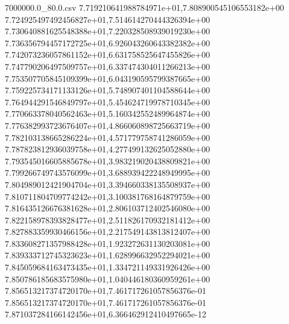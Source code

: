 \begin{filecontents*}{7000000.0_80.0.csv}
7.719210641988784971e+01,7.808900545106553182e+00
7.724925497492456827e+01,7.514614270444326394e+00
7.730640881625548388e+01,7.220328508939019230e+00
7.736356794457172725e+01,6.926043260643382382e+00
7.742073236057861152e+01,6.631758525647455826e+00
7.747790206497509757e+01,6.337474304011266213e+00
7.753507705845109399e+01,6.043190595799387665e+00
7.759225734171133126e+01,5.748907401104588644e+00
7.764944291546849797e+01,5.454624719978710345e+00
7.770663378040562463e+01,5.160342552489964874e+00
7.776382993723676407e+01,4.866060898725663719e+00
7.782103138665286224e+01,4.571779758741286059e+00
7.787823812936039758e+01,4.277499132625052880e+00
7.793545016605885678e+01,3.983219020438809821e+00
7.799266749743576099e+01,3.688939422248949995e+00
7.804989012421904704e+01,3.394660338135508937e+00
7.810711804709774242e+01,3.100381768164879759e+00
7.816435126676381628e+01,2.806103712402546080e+00
7.822158978393828477e+01,2.511826170932181412e+00
7.827883359930466156e+01,2.217549143813812407e+00
7.833608271357988428e+01,1.923272631130203081e+00
7.839333712745323623e+01,1.628996632952294021e+00
7.845059684163473435e+01,1.334721149331926426e+00
7.850786185683575980e+01,1.040446180360959261e+00
7.856513217374720170e+01,7.461717261057856376e-01
7.856513217374720170e+01,7.461717261057856376e-01
7.871037284166142456e+01,6.366462912410497665e-12
\end{filecontents*}

